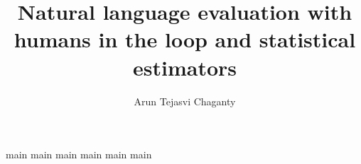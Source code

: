 \documentclass[12pt]{report}
\begin{document}
\title{Natural language evaluation with humans in the loop and statistical estimators}
\author{Arun Tejasvi Chaganty}
 
\beforepreface{}


\afterpreface{}

{main}
{main}
{main}
{main}
{main}
{main}

\appendix

%


\end{document}
